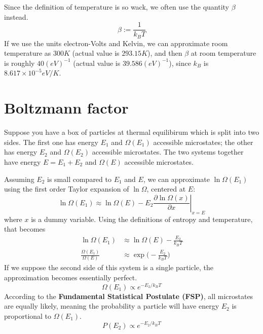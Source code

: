 \documentclass[12pt]{article}
\begin{document}
Since the definition of temperature is so wack, we often use the quantity $\beta$ instead.
\[\beta := \frac{1}{k_B T} \]
If we use the units electron-Volts and Kelvin, we can approximate room temperature as $300K$ (actual value is $293.15K$), and then $\beta$ at room temperature is roughly $40 (eV)^{-1}$ (actual value is $39.586 (eV)^{-1}$), since $k_B$ is $8.617 \times 10^{-5} eV/K$.

\section{Boltzmann factor}
Suppose you have a box of particles at thermal equilibirum which is split into two sides. The first one has energy $E_1$ and $\Omega(E_1)$ accessible microstates; the other has energy $E_2$ and $\Omega(E_2)$ accessible microstates. The two systems together have energy $E = E_1 + E_2$ and $\Omega(E)$ accessible microstates.

Assuming $E_2$ is small compared to $E_1$ and $E$, we can approximate $\ln \Omega(E_1)$ using the first order Taylor expansion of $\ln \Omega$, centered at $E$:
\[\ln \Omega(E_1) \approx \ln \Omega(E) - E_2 \left. \frac{\partial \ln \Omega(x)}{\partial x} \right|_{x=E}\]
where $x$ is a dummy variable. Using the definitions of entropy and temperature, that becomes
\begin{align*}
    \ln \Omega(E_1) &\approx \ln \Omega(E) - \frac{E_2}{k_B T} \\
    \frac{\Omega(E_1)}{\Omega(E)} &\approx \exp\Big( -\frac{E_2}{k_B T} \Big)
\end{align*}
If we suppose the second side of this system is a single particle, the approximation becomes essentially perfect.
\[\Omega(E_1) \propto e^{- E_2 / k_B T} \]
According to the \textbf{Fundamental Statistical Postulate (FSP)}, all microstates are equally likely, meaning the probability a particle will have energy $E_2$ is proportional to $\Omega(E_1)$.
\[P(E_2) \propto e^{- E_2 / k_B T} \]
\end{document}
